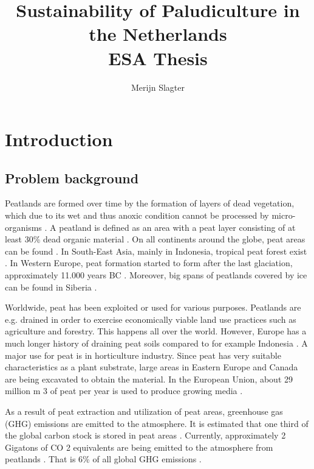 \documentclass[12pt,a4paper,titlepage]{article}
\author{Merijn Slagter}
\title{Sustainability of Paludiculture in the Netherlands \\ ESA Thesis}
\begin{document}
\maketitle
 
\tableofcontents

\section{Introduction}

\subsection{Problem background}

Peatlands are formed over time by the formation of layers of dead vegetation, which due to its wet and thus anoxic condition cannot be processed by micro-organisms \citep{clymo1984limits}. A peatland is defined as an area with a peat layer consisting of at least 30\% dead organic material \citep{joosten2002wise}. On all continents around the globe, peat areas can be found \citep{joosten2002wise}. In South-East Asia, mainly in Indonesia, tropical peat forest exist \citep{page2011global}. In Western Europe, peat formation started to form after the last glaciation, approximately 11.000 years BC \citep{brouns2016effects}. Moreover, big spans of peatlands covered by ice can be found in Siberia \citep{frey2005amplified}.

Worldwide, peat has been exploited or used for various purposes. Peatlands are e.g. drained in order to exercise economically viable land use practices such as agriculture and forestry. This happens all over the world. However, Europe has a much longer history of draining peat soils compared to for example Indonesia \citep{joosten2002wise}. A major use for peat is in horticulture industry. Since peat has very suitable characteristics as a plant substrate, large areas in Eastern Europe and Canada are being excavated to obtain the material. In the European Union, about 29 million m 3 of peat per year is used to produce growing media \citep{blievernicht2012youngest}.


As a result of peat extraction and utilization of peat areas, greenhouse gas (GHG) emissions are emitted to the atmosphere. It is estimated that one third of the global carbon stock is stored in peat areas \citep{page2011global}. Currently, approximately 2 Gigatons of CO 2 equivalents are being emitted to the atmosphere from peatlands \citep{joosten2009global}. That is 6\% of all global GHG emissions \citep{joosten2012peatlands}.
\end{document}
